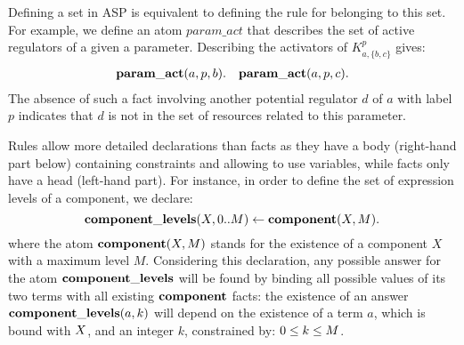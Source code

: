 Defining a set in ASP is equivalent to defining the rule for belonging to this set.
For example, we define an atom $param\_act$ that describes the set of active regulators of a given a parameter.
Describing the activators of $K^p_{a,\{b,c\}}$ gives:
\begin{align*}
  \mathbf{param\_act}(a, p, b).&&
  \mathbf{param\_act}(a, p, c).
\end{align*}
The absence of such a fact involving another potential regulator $d$ of $a$ with label $p$ indicates that $d$ is not in the set of resources related to this parameter.

Rules allow more detailed declarations than facts as they have a body (right-hand part below) containing constraints and allowing to use variables, while facts only have a head (left-hand part).
For instance, in order to define the set of expression levels of a component, we declare:
$$\mathbf{component\_levels}(X, 0..M) \leftarrow \mathbf{component}(X, M).$$
where the atom $\mathbf{component}(X, M)$ stands for the existence of a component $X$ with a maximum level $M$.
Considering this declaration, any possible answer for the atom $\mathbf{component\_levels}$ will be found by binding all possible values of its two terms with all existing $\mathbf{component}$ facts:
the existence of an answer $\mathbf{component\_levels}(a, k)$ will depend on the existence of a term $a$, which is bound with $X$, and an integer $k$, constrained by: $0 \leq k \leq M$.

